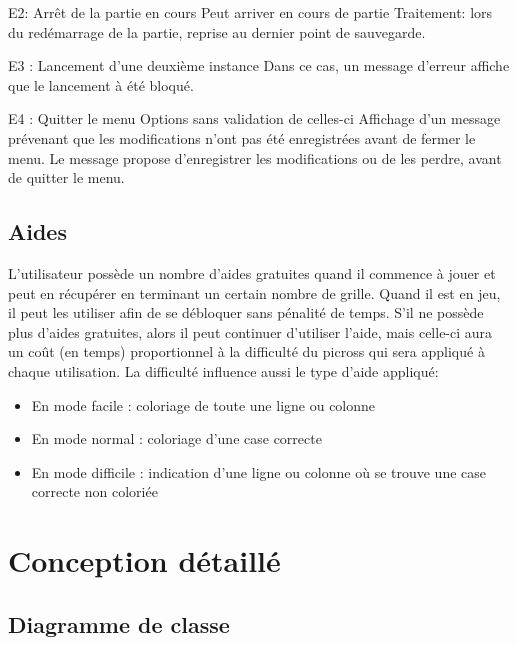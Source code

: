 \documentclass{report}
\begin{document}
		E2: Arrêt de la partie en cours
			Peut arriver en cours de partie
			Traitement: lors du redémarrage de la partie, reprise au dernier point de sauvegarde.
		
        E3 : Lancement d'une deuxième instance
                        Dans ce cas, un message d'erreur affiche que le lancement à été bloqué.

        E4 : Quitter le menu Options sans validation de celles-ci
                         Affichage d'un message prévenant que les modifications n'ont pas été enregistrées avant de   fermer le menu. Le message propose d'enregistrer les modifications ou de les perdre, avant de quitter le menu.
	
			
  \section{Aides}

  L'utilisateur possède un nombre d'aides gratuites quand il commence à jouer et peut en récupérer en terminant un certain nombre de grille. Quand il est en jeu, il peut les utiliser afin de se débloquer sans pénalité de temps. S'il ne possède plus d'aides gratuites, alors il peut continuer d'utiliser l'aide, mais celle-ci aura un coût (en temps) proportionnel à la difficulté du picross qui sera appliqué à chaque utilisation. La difficulté influence aussi le type d'aide appliqué:
    \begin{itemize}
    \item En mode facile : coloriage de toute une ligne ou colonne
    \item En mode normal : coloriage d'une case correcte 
    \item En mode difficile : indication d'une ligne ou colonne où se trouve une case correcte non coloriée
    \end{itemize}
  
			
\chapter{Conception détaillé}
\thispagestyle{empty}
\thispagestyle{plain}

    \section{Diagramme de classe}
    
\end{document}
